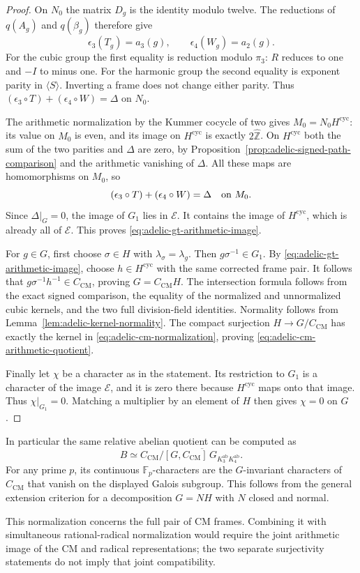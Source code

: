 \begin{proof}
On $N_0$ the matrix $D_g$ is the identity modulo twelve.
The reductions of $q(A_g)$ and $q(\beta_g)$ therefore give
\[
 \epsilon_3(T_g)=a_3(g),\qquad
 \epsilon_4(W_g)=a_2(g).
\]
For the cubic group the first equality is reduction modulo
$\pi_3$: $R$ reduces to one and $-I$ to minus one.
For the harmonic group the second equality is exponent parity
in $\langle S\rangle$.  Inverting a frame does not change either
parity.  Thus
$(\epsilon_3\circ T)+ (\epsilon_4\circ W)=\Delta$ on $N_0$.

The arithmetic normalization by the Kummer cocycle of two gives
$M_0=N_0H^{\mathrm{cyc}}$: its value on $M_0$ is even, and its
image on $H^{\mathrm{cyc}}$ is exactly
$2\widehat{\mathbb Z}$.  On $H^{\mathrm{cyc}}$ both the sum of
the two parities and $\Delta$ are zero, by
Proposition~\ref{prop:adelic-signed-path-comparison} and the
arithmetic vanishing of $\Delta$.
All these maps are homomorphisms on $M_0$, so
\begin{equation}
 (\epsilon_3\circ T)+ (\epsilon_4\circ W)=\Delta
                          \quad\hbox{on }M_0.
 \label{eq:adelic-parity-delta}
\end{equation}
Since $\Delta|_G=0$, the image of $G_1$ lies in $\mathcal E$.
It contains the image of $H^{\mathrm{cyc}}$, which is already
all of $\mathcal E$.  This proves
\eqref{eq:adelic-gt-arithmetic-image}.

For $g\in G$, first choose $\sigma\in H$ with
$\lambda_\sigma=\lambda_g$.  Then $g\sigma^{-1}\in G_1$.
By \eqref{eq:adelic-gt-arithmetic-image}, choose
$h\in H^{\mathrm{cyc}}$ with the same corrected frame pair.
It follows that $g\sigma^{-1}h^{-1}\in C_{\mathrm{CM}}$, proving
$G=C_{\mathrm{CM}}H$.
The intersection formula follows from the exact signed comparison,
the equality of the normalized and unnormalized cubic kernels,
and the two full division-field identities.
Normality follows from Lemma~\ref{lem:adelic-kernel-normality}.
The compact surjection $H\to G/C_{\mathrm{CM}}$ has exactly the
kernel in \eqref{eq:adelic-cm-normalization}, proving
\eqref{eq:adelic-cm-arithmetic-quotient}.

Finally let $\chi$ be a character as in the statement.
Its restriction to $G_1$ is a character of the image
$\mathcal E$, and it is zero there because
$H^{\mathrm{cyc}}$ maps onto that image.  Thus $\chi|_{G_1}=0$.
Matching a multiplier by an element of $H$ then gives $\chi=0$
on $G$.
\end{proof}

In particular the same relative abelian quotient can be computed as
\[
 B\simeq C_{\mathrm{CM}}\big/
       \overline{[G,C_{\mathrm{CM}}]\,
                 G_{K_3^{\mathrm{ab}}K_4^{\mathrm{ab}}}}.
\]
For any prime $p$, its continuous $\mathbb F_p$-characters are the
$G$-invariant characters of $C_{\mathrm{CM}}$ that vanish on the
displayed Galois subgroup.  This follows from the general extension
criterion for a decomposition $G=NH$ with $N$ closed and normal.

This normalization concerns the full pair of CM frames.  Combining
it with simultaneous rational-radical normalization would require
the joint arithmetic image of the CM and radical representations;
the two separate surjectivity statements do not imply that joint
compatibility.
